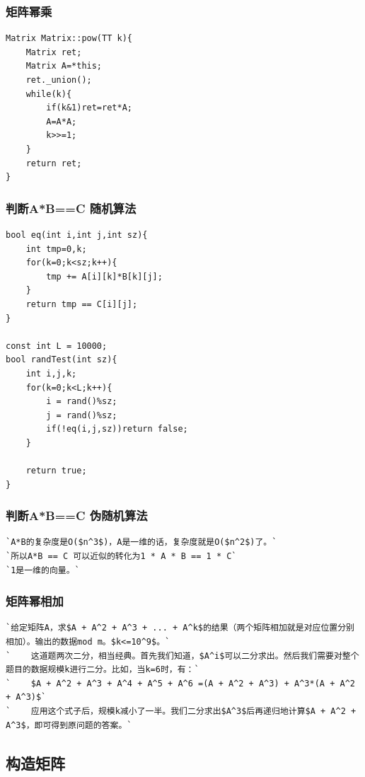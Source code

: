 \documentclass[a4paper]{article}
\begin{document}
\begin{CJK*}{UTF8}{gbsn}
\begin{multicols}{3}
\begin{flushleft}
\subsubsection{矩阵幂乘}
\begin{lstlisting}
Matrix Matrix::pow(TT k){
	Matrix ret;
	Matrix A=*this;
	ret._union();
	while(k){
		if(k&1)ret=ret*A;
		A=A*A;
		k>>=1; 
	}
	return ret; 
}
\end{lstlisting}

\subsubsection{判断A*B==C 随机算法}
\begin{lstlisting}
bool eq(int i,int j,int sz){
    int tmp=0,k;
    for(k=0;k<sz;k++){
        tmp += A[i][k]*B[k][j];
    }
    return tmp == C[i][j];
}

const int L = 10000;
bool randTest(int sz){
    int i,j,k;
    for(k=0;k<L;k++){
        i = rand()%sz;
        j = rand()%sz;
        if(!eq(i,j,sz))return false;
    }

    return true;
}
\end{lstlisting}

\subsubsection{判断A*B==C 伪随机算法}
\begin{lstlisting}
`A*B的复杂度是O($n^3$)，A是一维的话，复杂度就是O($n^2$)了。`
`所以A*B == C 可以近似的转化为1 * A * B == 1 * C`
`1是一维的向量。`
\end{lstlisting}

\subsubsection{矩阵幂相加}
\begin{lstlisting}
`给定矩阵A，求$A + A^2 + A^3 + ... + A^k$的结果（两个矩阵相加就是对应位置分别相加）。输出的数据mod m。$k<=10^9$。`
`    这道题两次二分，相当经典。首先我们知道，$A^i$可以二分求出。然后我们需要对整个题目的数据规模k进行二分。比如，当k=6时，有：`
`    $A + A^2 + A^3 + A^4 + A^5 + A^6 =(A + A^2 + A^3) + A^3*(A + A^2 + A^3)$`
`    应用这个式子后，规模k减小了一半。我们二分求出$A^3$后再递归地计算$A + A^2 + A^3$，即可得到原问题的答案。`
\end{lstlisting}

\subsection{构造矩阵}


\end{flushleft}
\end{multicols}
\end{CJK*}
\end{document}
